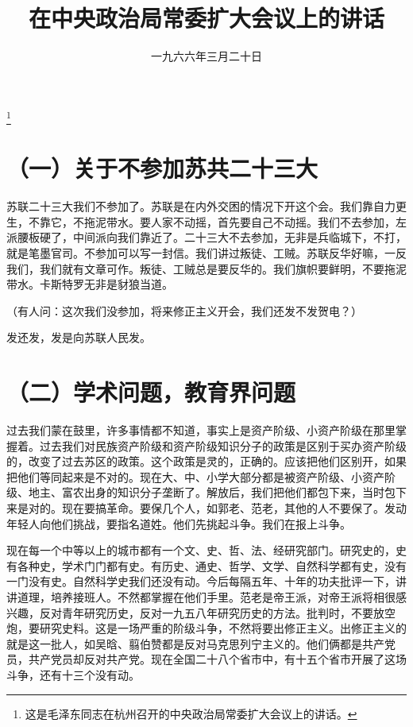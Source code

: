 
\title{在中央政治局常委扩大会议上的讲话}
\date{一九六六年三月二十日}
\thanks{这是毛泽东同志在杭州召开的中央政治局常委扩大会议上的讲话。}
\maketitle


\section{（一）关于不参加苏共二十三大}

苏联二十三大我们不参加了。苏联是在内外交困的情况下开这个会。我们靠自力更生，不靠它，不拖泥带水。要人家不动摇，首先要自己不动摇。我们不去参加，左派腰板硬了，中间派向我们靠近了。二十三大不去参加，无非是兵临城下，不打，就是笔墨官司。不参加可以写一封信。我们讲过叛徒、工贼。苏联反华好嘛，一反我们，我们就有文章可作。叛徒、工贼总是要反华的。我们旗帜要鲜明，不要拖泥带水。卡斯特罗无非是豺狼当道。

（有人问：这次我们没参加，将来修正主义开会，我们还发不发贺电？）

发还发，发是向苏联人民发。

\section{（二）学术问题，教育界问题}

过去我们蒙在鼓里，许多事情都不知道，事实上是资产阶级、小资产阶级在那里掌握着。过去我们对民族资产阶级和资产阶级知识分子的政策是区别于买办资产阶级的，改变了过去苏区的政策。这个政策是灵的，正确的。应该把他们区别开，如果把他们等同起来是不对的。现在大、中、小学大部分都是被资产阶级、小资产阶级、地主、富农出身的知识分子垄断了。解放后，我们把他们都包下来，当时包下来是对的。现在要搞革命。要保几个人，如郭老、范老，其他的人不要保了。发动年轻人向他们挑战，要指名道姓。他们先挑起斗争。我们在报上斗争。

现在每一个中等以上的城市都有一个文、史、哲、法、经研究部门。研究史的，史有各种史，学术门门都有史。有历史、通史、哲学、文学、自然科学都有史，没有一门没有史。自然科学史我们还没有动。今后每隔五年、十年的功夫批评一下，讲讲道理，培养接班人。不然都掌握在他们手里。范老是帝王派，对帝王派将相很感兴趣，反对青年研究历史，反对一九五八年研究历史的方法。批判时，不要放空炮，要研究史料。这是一场严重的阶级斗争，不然将要出修正主义。出修正主义的就是这一批人，如吴晗、翦伯赞都是反对马克思列宁主义的。他们俩都是共产党员，共产党员却反对共产党。现在全国二十八个省市中，有十五个省市开展了这场斗争，还有十三个没有动。

